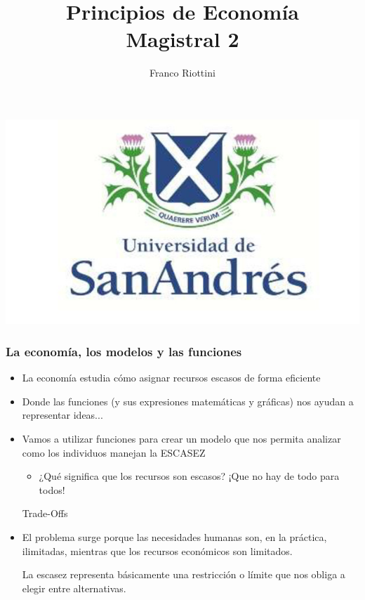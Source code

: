 \documentclass{beamer}
\title[Principios de Economía]{Principios de Economía \vspace{4mm}
\\ Magistral 2}
\date{}
\author[Riottini]{Franco Riottini}
\institute[]{Universidad de San Andrés}
\begin{document}
\begin{frame}
\titlepage
\centering
\includegraphics[scale=0.2]{../Figures/logoUDESA.jpg} 
\end{frame}


\begin{frame}
\frametitle{La economía, los modelos y las funciones}
\begin{itemize}
    \item La economía estudia cómo asignar recursos escasos de forma eficiente
    \item Donde las funciones (y sus expresiones matemáticas y gráficas) nos ayudan a representar ideas...
    \item Vamos a utilizar funciones para crear un modelo que nos permita analizar como los individuos manejan la ESCASEZ 
    \begin{itemize}
        \item ¿Qué significa que los recursos son escasos? ¡Que no hay de todo para todos!
    \end{itemize}
    \begin{boxA}
        \begin{center}
        
            Trade-Offs
        
        \end{center}
    \end{boxA}
    \item El problema surge porque las necesidades humanas son, en la práctica, ilimitadas, mientras que los recursos económicos son limitados. 
    \begin{boxA}
        \begin{center}
        
            La escasez representa básicamente una restricción o límite que nos obliga a elegir entre alternativas.
        
        \end{center}
    \end{boxA} 
\end{itemize} 
\end{frame}
\end{document}

